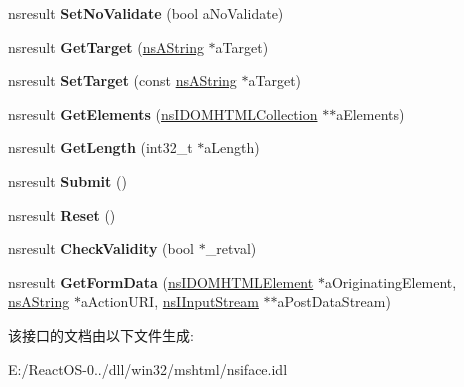 \begin{DoxyCompactItemize}
\item 
\mbox{\label{interfacens_i_d_o_m_h_t_m_l_form_element_a353474dc62d52dd467a87c1740c5b26b}} 
nsresult {\bfseries Set\+No\+Validate} (bool a\+No\+Validate)
\item 
\mbox{\label{interfacens_i_d_o_m_h_t_m_l_form_element_a92730855e18d7a423d35b1f8c55ecd51}} 
nsresult {\bfseries Get\+Target} (\hyperlink{structns_string_container}{ns\+A\+String} $\ast$a\+Target)
\item 
\mbox{\label{interfacens_i_d_o_m_h_t_m_l_form_element_a143d05c82012259a53875bde2c4bcba3}} 
nsresult {\bfseries Set\+Target} (const \hyperlink{structns_string_container}{ns\+A\+String} $\ast$a\+Target)
\item 
\mbox{\label{interfacens_i_d_o_m_h_t_m_l_form_element_a18f1ffb6d3ddba0b1ee719d0ae08ff89}} 
nsresult {\bfseries Get\+Elements} (\hyperlink{interfacens_i_d_o_m_h_t_m_l_collection}{ns\+I\+D\+O\+M\+H\+T\+M\+L\+Collection} $\ast$$\ast$a\+Elements)
\item 
\mbox{\label{interfacens_i_d_o_m_h_t_m_l_form_element_a374427db200275c54948c8cc244c5bcd}} 
nsresult {\bfseries Get\+Length} (int32\+\_\+t $\ast$a\+Length)
\item 
\mbox{\label{interfacens_i_d_o_m_h_t_m_l_form_element_aa3740ca9f4d094c6470f3b50711ef3ab}} 
nsresult {\bfseries Submit} ()
\item 
\mbox{\label{interfacens_i_d_o_m_h_t_m_l_form_element_a4f4d6cbdb2430209a9a4d5c2aaff47a8}} 
nsresult {\bfseries Reset} ()
\item 
\mbox{\label{interfacens_i_d_o_m_h_t_m_l_form_element_af594513c1878e88cc23b7f147365d5e8}} 
nsresult {\bfseries Check\+Validity} (bool $\ast$\+\_\+retval)
\item 
\mbox{\label{interfacens_i_d_o_m_h_t_m_l_form_element_af88e885f88f254bad37109dd3453ef60}} 
nsresult {\bfseries Get\+Form\+Data} (\hyperlink{interfacens_i_d_o_m_h_t_m_l_element}{ns\+I\+D\+O\+M\+H\+T\+M\+L\+Element} $\ast$a\+Originating\+Element, \hyperlink{structns_string_container}{ns\+A\+String} $\ast$a\+Action\+U\+RI, \hyperlink{interfacens_i_input_stream}{ns\+I\+Input\+Stream} $\ast$$\ast$a\+Post\+Data\+Stream)
\end{DoxyCompactItemize}


该接口的文档由以下文件生成\+:\begin{DoxyCompactItemize}
\item 
E\+:/\+React\+O\+S-\/0../dll/win32/mshtml/nsiface.\+idl\end{DoxyCompactItemize}
